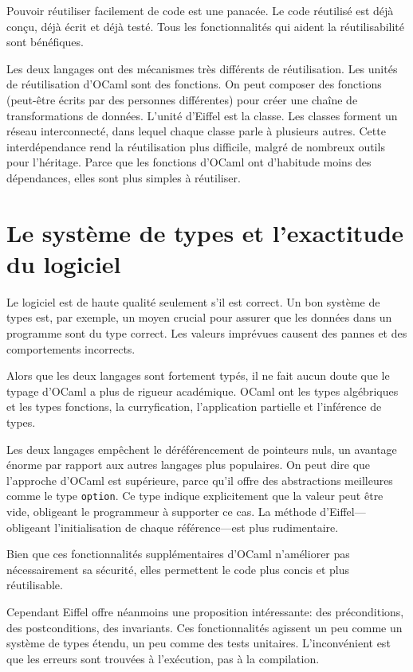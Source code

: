 \documentclass[french]{report}
\begin{document}
Pouvoir réutiliser facilement de code est une panacée. Le code réutilisé est déjà conçu, déjà écrit et déjà testé. Tous les fonctionnalités qui aident la réutilisabilité sont bénéfiques.

Les deux langages ont des mécanismes très différents de réutilisation. Les unités de réutilisation d'OCaml sont des fonctions. On peut composer des fonctions (peut-être écrits par des personnes différentes) pour créer une chaîne de transformations de données. L'unité d'Eiffel est la classe. Les classes forment un réseau interconnecté, dans lequel chaque classe parle à plusieurs autres. Cette interdépendance rend la réutilisation plus difficile, malgré de nombreux outils pour l'héritage. Parce que les fonctions d'OCaml ont d'habitude moins des dépendances, elles sont plus simples à réutiliser.

\section{Le système de types et l'exactitude du logiciel}

Le logiciel est de haute qualité seulement s'il est correct. Un bon système de types est, par exemple, un moyen crucial pour assurer que les données dans un programme sont du type correct. Les valeurs imprévues causent des pannes et des comportements incorrects.

Alors que les deux langages sont fortement typés, il ne fait aucun doute que le typage d'OCaml a plus de rigueur académique. OCaml ont les types algébriques et les types fonctions, la curryfication, l'application partielle et l'inférence de types.

Les deux langages empêchent le déréférencement de pointeurs nuls, un avantage énorme par rapport aux autres langages plus populaires. On peut dire que l'approche d'OCaml est supérieure, parce qu'il offre des abstractions meilleures comme le type \texttt{option}. Ce type indique explicitement que la valeur peut être vide, obligeant le programmeur à supporter ce cas. La méthode d'Eiffel---obligeant l'initialisation de chaque référence---est plus rudimentaire.

Bien que ces fonctionnalités supplémentaires d'OCaml n'améliorer pas nécessairement sa sécurité, elles permettent le code plus concis et plus réutilisable.

Cependant Eiffel offre néanmoins une proposition intéressante: des préconditions, des postconditions, des invariants. Ces fonctionnalités agissent un peu comme un système de types étendu, un peu comme des tests unitaires. L'inconvénient est que les erreurs sont trouvées à l'exécution, pas à la compilation.
\end{document}
